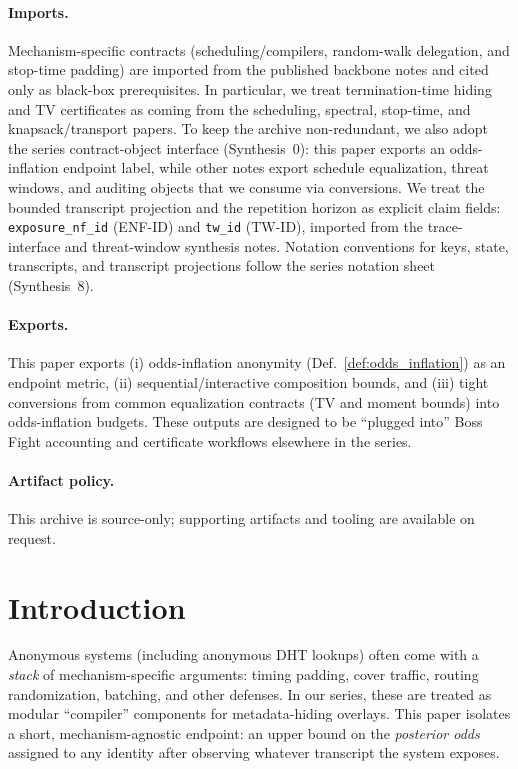 \documentclass[11pt]{article}
\theoremstyle{definition}
\theoremstyle{remark}
\begin{document}
\paragraph{Imports.}
Mechanism-specific contracts (scheduling/compilers, random-walk delegation, and stop-time padding) are imported from the published backbone notes and cited only as black-box prerequisites.
In particular, we treat termination-time hiding and TV certificates as coming from the scheduling, spectral, stop-time, and knapsack/transport papers.\cite{series:schedcompiler,series:spectral,series:stoptimeaddendum,series:knapsacktransport}
To keep the archive non-redundant, we also adopt the series contract-object interface (Synthesis~0): this paper exports an odds-inflation endpoint label, while other notes export schedule equalization, threat windows, and auditing objects that we consume via conversions.\cite{series:contractobjects}
We treat the bounded transcript projection and the repetition horizon as explicit claim fields: \texttt{exposure\_nf\_id} (ENF-ID) and \texttt{tw\_id} (TW-ID), imported from the trace-interface and threat-window synthesis notes.\cite{series:traceifaces,series:threatwindows}
Notation conventions for keys, state, transcripts, and transcript projections follow the series notation sheet (Synthesis~8).\cite{series:notation}


\paragraph{Exports.}
This paper exports (i) odds-inflation anonymity (Def.~\ref{def:odds_inflation}) as an endpoint metric, (ii) sequential/interactive composition bounds, and (iii) tight conversions from common equalization contracts (TV and moment bounds) into odds-inflation budgets.
These outputs are designed to be ``plugged into'' Boss Fight accounting and certificate workflows elsewhere in the series.\cite{series:endpointbridge}

\paragraph{Artifact policy.}
This archive is source-only; supporting artifacts and tooling are available on request.\cite{series:artifactpolicy}


\section{Introduction}
Anonymous systems (including anonymous DHT lookups) often come with a \emph{stack} of mechanism-specific arguments:
timing padding, cover traffic, routing randomization, batching, and other defenses.
In our series, these are treated as modular ``compiler'' components for metadata-hiding overlays.
This paper isolates a short, mechanism-agnostic endpoint: an upper bound on the \emph{posterior odds} assigned to any identity after observing whatever transcript the system exposes.
\end{document}
